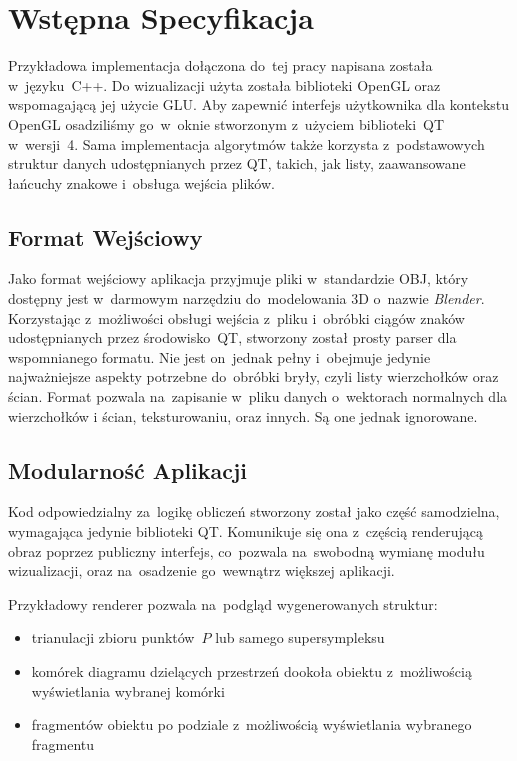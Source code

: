 \documentclass[skorowidz,autorrok,backref,xodstep,oswiadczenie]{wmimgr}
\begin{document}
\section{Wstępna Specyfikacja}

Przykładowa implementacja dołączona do~tej pracy napisana została w~języku~C++. Do wizualizacji użyta została biblioteki OpenGL oraz wspomagającą jej użycie GLU. Aby zapewnić interfejs użytkownika dla kontekstu OpenGL osadziliśmy go~w~oknie stworzonym z~użyciem biblioteki~QT w~wersji~4. Sama implementacja algorytmów także korzysta z~podstawowych struktur danych udostępnianych przez QT, takich, jak listy, zaawansowane łańcuchy znakowe i~obsługa wejścia plików.

\subsection{Format Wejściowy}

Jako format wejściowy aplikacja przyjmuje pliki w~standardzie OBJ, który dostępny jest w~darmowym narzędziu do~modelowania 3D o~nazwie \emph{Blender}. Korzystając z~możliwości obsługi wejścia z~pliku i~obróbki ciągów znaków udostępnianych przez środowisko~QT, stworzony został prosty parser dla wspomnianego formatu. Nie jest on~jednak pełny i~obejmuje jedynie najważniejsze aspekty potrzebne do~obróbki bryły, czyli listy wierzchołków oraz ścian. Format pozwala na~zapisanie w~pliku danych o~wektorach normalnych dla wierzchołków i ścian, teksturowaniu, oraz innych. Są one jednak ignorowane.

\subsection{Modularność Aplikacji}

Kod odpowiedzialny za~logikę obliczeń stworzony został jako część samodzielna, wymagająca jedynie biblioteki QT. Komunikuje się ona z~częścią renderującą obraz poprzez publiczny interfejs, co~pozwala na~swobodną wymianę modułu wizualizacji, oraz na~osadzenie go~wewnątrz większej aplikacji.

Przykładowy renderer pozwala na~podgląd wygenerowanych struktur:
\begin{itemize}
\item
trianulacji zbioru punktów~$P$ lub samego supersympleksu
\item
komórek diagramu dzielących przestrzeń dookoła obiektu z~możliwością wyświetlania wybranej komórki
\item
fragmentów obiektu po podziale z~możliwością wyświetlania wybranego fragmentu
\end{itemize}
\end{document}
